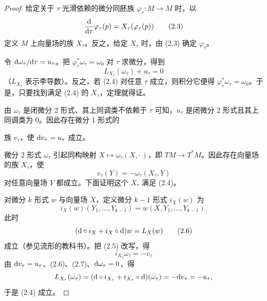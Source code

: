 \begin{proof}
  给定关于 $\tau$ 光滑依赖的微分同胚族 $\varphi_\tau\colon M\to M$ 时，以
  \begin{equation}
    \frac{\mathrm{d}}{\mathrm{d}\tau}\varphi_\tau(p)=X_\tau(\varphi_\tau(p)) \tag{2.3}
  \end{equation}
  定义 $M$ 上向量场的族 $X_\tau$。反之，给定 $X_\tau$ 时，由 (2.3) 确定 $\varphi_\tau$。

  令 $\mathrm{d}\omega_\tau/\mathrm{d}\tau=u_\tau$。把 $\varphi_\tau^*\omega_\tau=\omega_0$ 对 $\tau$ 求微分，得到
  \begin{equation}
    L_{X_\tau}(\omega_\tau)+u_\tau=0 \tag{2.4}
  \end{equation}
  （$L_{X_\tau}$ 表示李导数）。反之，若 (2.4) 对任意 $\tau$ 成立，则积分它便得 $\varphi_\tau^*\omega_\tau=\omega_0$。于是，只要找到满足 (2.4) 的 $X_\tau$，定理就得证。

  由 $\omega_\tau$ 是闭微分 2 形式、其上同调类不依赖于 $\tau$ 可知，$u_\tau$ 是闭微分 2 形式且其上同调类为 0。因此存在微分 1 形式的

  族 $v_\tau$，使 $\mathrm{d} v_\tau=u_\tau$ 成立。

  微分 2 形式 $\omega_\tau$ 引起同构映射 $X\mapsto\omega_\tau(X,\cdot\,)$，即 $TM\to T^*M$。因此存在向量场的族 $X_\tau$，使
  \begin{equation}
    v_\tau(Y)=-\omega_\tau(X_\tau,Y) \tag{2.5}
  \end{equation}
  对任意向量场 $Y$ 都成立。下面证明这个 $X_\tau$ 满足 (2.4)。

  对微分 $k$ 形式 $w$ 与向量场 $X$，定义微分 $k-1$ 形式 $i_X(w)$ 为
  \[
    i_X(w)(Y_1,\dots,Y_{k-1})=w(X,Y_1,\dots,Y_{k-1}).
  \]
  此时
  \begin{equation}
    (\mathrm{d}\circ i_X+i_X\circ\mathrm{d})w=L_X(w) \tag{2.6}
  \end{equation}
  成立（参见流形的教科书）。把 (2.5) 改写，得
  \begin{equation}
    i_{X_\tau}\omega_\tau=-v_\tau \tag{2.7}
  \end{equation}
  由 $\mathrm{d} v_\tau=u_\tau$、(2.6)、(2.7)、$\mathrm{d}\omega_\tau=0$，得
  \[
    L_{X_\tau}(\omega_\tau)=(\mathrm{d}\circ i_{X_\tau}+i_{X_\tau}\circ\mathrm{d})(\omega_\tau)=-\mathrm{d} v_\tau=-u_\tau,
  \]
  于是 (2.4) 成立。
\end{proof}

